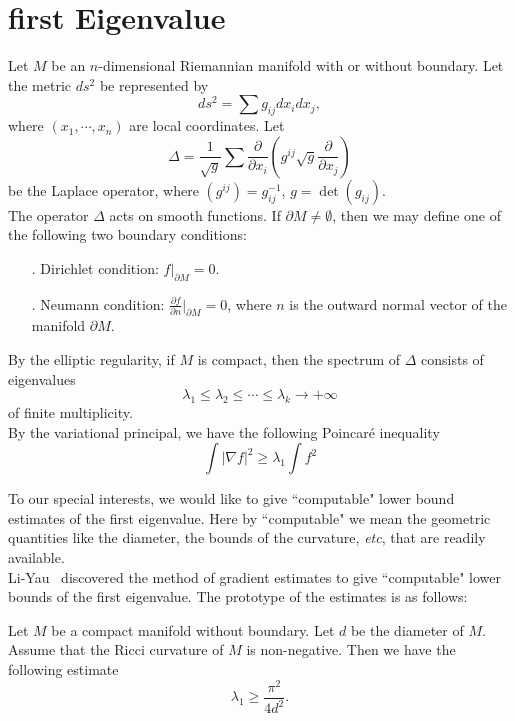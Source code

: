 \section{first Eigenvalue}\label{First_eigenvalue}


Let $M$ be an $n$-dimensional Riemannian manifold with or without boundary. Let
the metric $ds^2$ be represented by
\[
ds^2 = \sum g_{ij}dx_idx_j,
\]
where $(x_1,\cdots,x_n)$ are local coordinates. Let
\[
\Delta = \frac{1}{\sqrt{g}}\sum\frac{\partial}{\partial x_i}(g^{ij}\sqrt{g}
\frac{\partial}{\partial x_j})
\]
be the Laplace operator, where $(g^{ij})=g_{ij}^{-1}$, $g=\det (g_{ij})$.
\\

The operator $\Delta$ acts on smooth functions. If $\partial M \neq \emptyset$,
then we may define one of  the following two boundary conditions:
\begin{itemize}
\item[\ding{172}.] Dirichlet condition: $f|_{\partial M} = 0$.
\item[\ding{173}.] Neumann condition: 
$\frac{\partial f}{\partial n}|_{\partial M} = 0$, where $n$ is the outward
normal vector of the manifold $\partial M$.
\end{itemize}

By the elliptic regularity, if $M$ is compact, then the spectrum of $\Delta$
consists of eigenvalues
\[
\lambda_1 \leqslant \lambda_2 \leqslant \cdots \leqslant \lambda_k \rightarrow
+\infty
\]
of  finite multiplicity.
\\

By the variational principal, we have the following Poincar\'{e} inequality
\[
\int|\nabla f|^2 \geqslant \lambda_1\int f^2
\]

To our special interests, we would like to give
``computable" lower bound estimates of the first eigenvalue. Here by 
``computable" we mean the geometric quantities like the diameter, the bounds of 
the curvature, \textit{etc}, that are readily available.
\\

Li-Yau~\cite{li-yau} discovered the method of gradient estimates to give ``computable" lower
bounds of the first eigenvalue. The prototype of the estimates is as follows:
\begin{theorem}
[Li-Yau] Let $M$ be a compact manifold without boundary. Let $d$ be the diameter
of $M$. Assume that the Ricci curvature of $M$ is non-negative. Then we have
the following estimate
\[
\lambda_1 \geqslant \frac{\pi^2}{4d^2}.
\]
\end{theorem}


